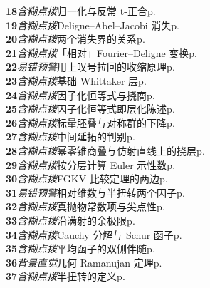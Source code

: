 \begin{multicols}{2}
\noindent\textbf{18}\;\textit{含糊点拨}\;归一化与反常 t-正合\hfill p.\,\pageref{tn:18}\\[1pt]
\noindent\textbf{19}\;\textit{含糊点拨}\;Deligne–Abel–Jacobi 消失\hfill p.\,\pageref{tn:19}\\[1pt]
\noindent\textbf{20}\;\textit{含糊点拨}\;两个消失界的关系\hfill p.\,\pageref{tn:20}\\[1pt]
\noindent\textbf{21}\;\textit{含糊点拨}\;「相对」Fourier–Deligne 变换\hfill p.\,\pageref{tn:21}\\[1pt]
\noindent\textbf{22}\;\textit{易错预警}\;用上叹号拉回的收缩原理\hfill p.\,\pageref{tn:22}\\[1pt]
\noindent\textbf{23}\;\textit{含糊点拨}\;基础 Whittaker 层\hfill p.\,\pageref{tn:23}\\[1pt]
\noindent\textbf{24}\;\textit{含糊点拨}\;因子化恒等式与挠商\hfill p.\,\pageref{tn:24}\\[1pt]
\noindent\textbf{25}\;\textit{含糊点拨}\;因子化恒等式即层化陈述\hfill p.\,\pageref{tn:25}\\[1pt]
\noindent\textbf{26}\;\textit{含糊点拨}\;标量胚叠与对称群的下降\hfill p.\,\pageref{tn:26}\\[1pt]
\noindent\textbf{27}\;\textit{含糊点拨}\;中间延拓的判别\hfill p.\,\pageref{tn:27}\\[1pt]
\noindent\textbf{28}\;\textit{含糊点拨}\;幂零锥商叠与仿射直线上的挠层\hfill p.\,\pageref{tn:28}\\[1pt]
\noindent\textbf{29}\;\textit{含糊点拨}\;按分层计算 Euler 示性数\hfill p.\,\pageref{tn:29}\\[1pt]
\noindent\textbf{30}\;\textit{含糊点拨}\;FGKV 比较定理的两边\hfill p.\,\pageref{tn:30}\\[1pt]
\noindent\textbf{31}\;\textit{易错预警}\;相对维数与半扭转两个因子\hfill p.\,\pageref{tn:31}\\[1pt]
\noindent\textbf{32}\;\textit{含糊点拨}\;真抛物常数项与尖点性\hfill p.\,\pageref{tn:32}\\[1pt]
\noindent\textbf{33}\;\textit{含糊点拨}\;沿满射的余极限\hfill p.\,\pageref{tn:33}\\[1pt]
\noindent\textbf{34}\;\textit{含糊点拨}\;Cauchy 分解与 Schur 函子\hfill p.\,\pageref{tn:34}\\[1pt]
\noindent\textbf{35}\;\textit{含糊点拨}\;平均函子的双侧伴随\hfill p.\,\pageref{tn:35}\\[1pt]
\noindent\textbf{36}\;\textit{背景直觉}\;几何 Ramanujan 定理\hfill p.\,\pageref{tn:36}\\[1pt]
\noindent\textbf{37}\;\textit{含糊点拨}\;半扭转的定义\hfill p.\,\pageref{tn:37}\\[1pt]

\end{multicols}

